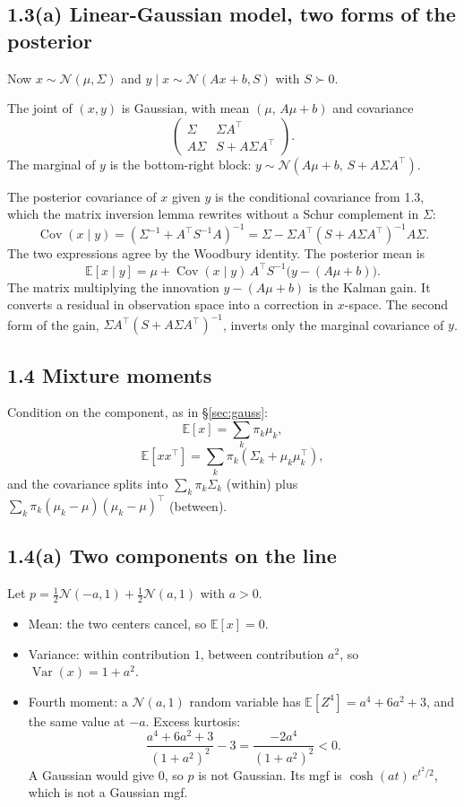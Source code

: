 \documentclass[11pt]{article}
\theoremstyle{remark}
\newcommand{\E}{\mathbb{E}}
\newcommand{\Var}{\operatorname{Var}}
\newcommand{\Cov}{\operatorname{Cov}}
\newcommand{\N}{\mathcal{N}}
\begin{document}
\subsection*{1.3(a) Linear-Gaussian model, two forms of the posterior}

Now \(x\sim\N(\mu,\Sigma)\) and \(y\mid x\sim\N(Ax+b,S)\) with \(S\succ 0\).

The joint of \((x,y)\) is Gaussian, with mean \((\mu,\,A\mu+b)\) and covariance
\[
\begin{pmatrix}
\Sigma & \Sigma A^\top\\
A\Sigma & S+A\Sigma A^\top
\end{pmatrix}.
\]
The marginal of \(y\) is the bottom-right block: \(y\sim\N(A\mu+b,\,S+A\Sigma A^\top)\).

The posterior covariance of \(x\) given \(y\) is the conditional covariance from 1.3, which the matrix inversion lemma rewrites without a Schur complement in \(\Sigma\):
\[
\Cov(x\mid y)
=(\Sigma^{-1}+A^\top S^{-1}A)^{-1}
=\Sigma-\Sigma A^\top(S+A\Sigma A^\top)^{-1}A\Sigma.
\]
The two expressions agree by the Woodbury identity. The posterior mean is
\[
\E[x\mid y]
=\mu+\Cov(x\mid y)\,A^\top S^{-1}\big(y-(A\mu+b)\big).
\]
The matrix multiplying the innovation \(y-(A\mu+b)\) is the Kalman gain. It converts a residual in observation space into a correction in \(x\)-space. The second form of the gain, \(\Sigma A^\top(S+A\Sigma A^\top)^{-1}\), inverts only the marginal covariance of \(y\).

\subsection*{1.4 Mixture moments}

Condition on the component, as in \S\ref{sec:gauss}:
\[
\E[x]=\sum_k\pi_k\mu_k,
\]
\[
\E[xx^\top]=\sum_k\pi_k(\Sigma_k+\mu_k\mu_k^\top),
\]
and the covariance splits into \(\sum_k\pi_k\Sigma_k\) (within) plus \(\sum_k\pi_k(\mu_k-\mu)(\mu_k-\mu)^\top\) (between).

\subsection*{1.4(a) Two components on the line}

Let \(p=\tfrac12\N(-a,1)+\tfrac12\N(a,1)\) with \(a>0\).
\begin{itemize}
\item Mean: the two centers cancel, so \(\E[x]=0\).
\item Variance: within contribution \(1\), between contribution \(a^2\), so \(\Var(x)=1+a^2\).
\item Fourth moment: a \(\N(a,1)\) random variable has \(\E[Z^4]=a^4+6a^2+3\), and the same value at \(-a\). Excess kurtosis:
\[
\frac{a^4+6a^2+3}{(1+a^2)^2}-3=\frac{-2a^4}{(1+a^2)^2}<0.
\]
A Gaussian would give \(0\), so \(p\) is not Gaussian. Its mgf is \(\cosh(at)\,e^{t^2/2}\), which is not a Gaussian mgf.
\end{itemize}
\end{document}
